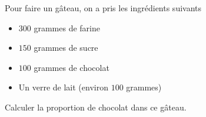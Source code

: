 
\begin{exercice}\label{exosmath-0893}

Pour faire un gâteau, on a pris les ingrédients suivants
\begin{itemize}
    \item 
 $300$ grammes de farine
 \item
 $150$ grammes de sucre
 \item
 $100$ grammes de chocolat
 \item
 Un verre de lait (environ $100$ grammes)
\end{itemize}
Calculer la proportion de chocolat dans ce gâteau.


\end{exercice}
